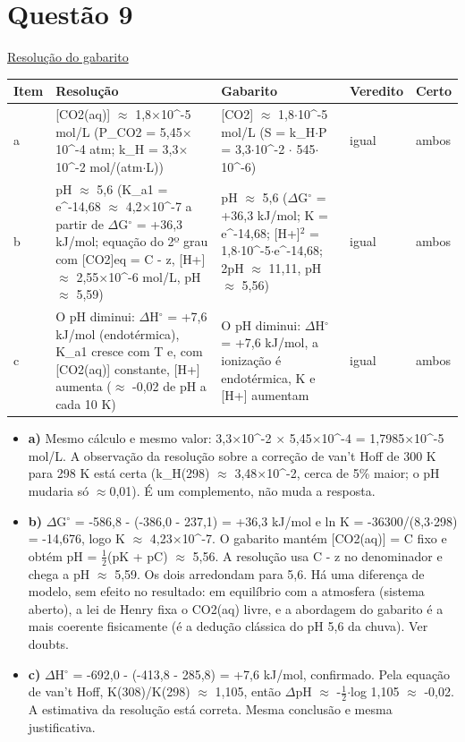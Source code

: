 \documentclass{article}%
\begin{document}
\section*{Questão 9}%
\href{https://poliedroresolve.sistemapoliedro.com.br/vestibulares/ime/2026/ime-2-fase-dia-3-25-10-2025-2-fase-dia-3/dissertativa-9-quimica-2-fase-dia-3-ime-2026}{Resolução do gabarito}\par\smallskip%
\begin{longtable}{@{}p{} p{} p{} p{} p{}@{}}\toprule Item & Resolução & Gabarito & Veredito & Certo \\ \midrule
a & {[}CO2(aq){]} $\approx$ 1,8$\times$10\^{}{-}5 mol/L (P\_CO2 = 5,45$\times$10\^{}{-}4 atm; k\_H = 3,3$\times$10\^{}{-}2 mol/(atm$\cdot$L)) & {[}CO2{]} $\approx$ 1,8$\cdot$10\^{}{-}5 mol/L (S = k\_H$\cdot$P = 3,3$\cdot$10\^{}{-}2 $\cdot$ 545$\cdot$10\^{}{-}6) & igual & ambos \\
b & pH $\approx$ 5,6 (K\_a1 = e\^{}{-}14,68 $\approx$ 4,2$\times$10\^{}{-}7 a partir de $\Delta$G$^\circ$ = +36,3 kJ/mol; equação do 2º grau com {[}CO2{]}eq = C - z, {[}H+{]} $\approx$ 2,55$\times$10\^{}{-}6 mol/L, pH $\approx$ 5,59) & pH $\approx$ 5,6 ($\Delta$G$^\circ$ = +36,3 kJ/mol; K = e\^{}{-}14,68; {[}H+{]}$^2$ = 1,8$\cdot$10\^{}{-}5$\cdot$e\^{}{-}14,68; 2pH $\approx$ 11,11, pH $\approx$ 5,56) & igual & ambos \\
c & O pH diminui: $\Delta$H$^\circ$ = +7,6 kJ/mol (endotérmica), K\_a1 cresce com T e, com {[}CO2(aq){]} constante, {[}H+{]} aumenta ($\approx$ -0,02 de pH a cada 10 K) & O pH diminui: $\Delta$H$^\circ$ = +7,6 kJ/mol, a ionização é endotérmica, K e {[}H+{]} aumentam & igual & ambos \\
\bottomrule\end{longtable}%
\begin{itemize}%
\item%
\textbf{a)} Mesmo cálculo e mesmo valor: 3,3$\times$10\^{}{-}2 $\times$ 5,45$\times$10\^{}{-}4 = 1,7985$\times$10\^{}{-}5 mol/L. A observação da resolução sobre a correção de van't Hoff de 300 K para 298 K está certa (k\_H(298) $\approx$ 3,48$\times$10\^{}{-}2, cerca de 5\% maior; o pH mudaria só $\approx$0,01). É um complemento, não muda a resposta.%
\item%
\textbf{b)} $\Delta$G$^\circ$ = -586,8 - (-386,0 - 237,1) = +36,3 kJ/mol e ln K = -36300/(8,3$\cdot$298) = -14,676, logo K $\approx$ 4,23$\times$10\^{}{-}7. O gabarito mantém {[}CO2(aq){]} = C fixo e obtém pH = $\frac12$(pK + pC) $\approx$ 5,56. A resolução usa C - z no denominador e chega a pH $\approx$ 5,59. Os dois arredondam para 5,6. Há uma diferença de modelo, sem efeito no resultado: em equilíbrio com a atmosfera (sistema aberto), a lei de Henry fixa o CO2(aq) livre, e a abordagem do gabarito é a mais coerente fisicamente (é a dedução clássica do pH 5,6 da chuva). Ver doubts.%
\item%
\textbf{c)} $\Delta$H$^\circ$ = -692,0 - (-413,8 - 285,8) = +7,6 kJ/mol, confirmado. Pela equação de van't Hoff, K(308)/K(298) $\approx$ 1,105, então $\Delta$pH $\approx$ -$\frac12$$\cdot$log 1,105 $\approx$ -0,02. A estimativa da resolução está correta. Mesma conclusão e mesma justificativa.%
\end{itemize}%
\end{document}

